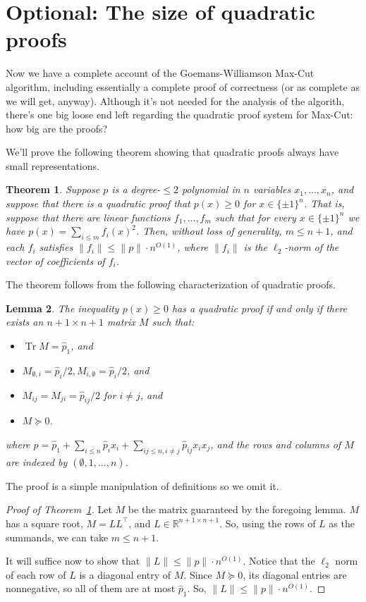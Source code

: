 \documentclass[11pt]{article}
\newtheorem{theorem}{Theorem}
\newtheorem{lemma}[theorem]{Lemma}
\newcommand{\R}{\mathbb{R}} %
\DeclareMathOperator{\Tr}{Tr} %
\begin{document}
\section{Optional: The size of quadratic proofs}
Now we have a complete account of the Goemans-Williamson Max-Cut algorithm, including essentially a complete proof of correctness (or as complete as we will get, anyway).
Although it's not needed for the analysis of the algorith, there's one big loose end left regarding the quadratic proof system for Max-Cut: how big are the proofs?

We'll prove the following theorem showing that quadratic proofs always have small representations.
\begin{theorem}
  \label{thm:proof-size}
Suppose $p$ is a degree-$\leq 2$ polynomial in $n$ variables $x_1,\ldots,x_n$, and suppose that there is a quadratic proof that $p(x) \geq 0$ for $x \in \{ \pm 1\}^n$.
That is, suppose that there are linear functions $f_1,\ldots,f_m$ such that for every $x \in \{ \pm 1 \}^n$ we have $p(x) = \sum_{i \leq m} f_i(x)^2$.
Then, without loss of generality, $m \leq n+1$, and each $f_i$ satisfies $\|f_i\| \leq \|p\| \cdot n^{O(1)}$, where $\|f_i\|$ is the $\ell_2$-norm of the vector of coefficients of $f_i$.
\end{theorem}

The theorem follows from the following characterization of quadratic proofs.

\begin{lemma}
The inequality $p(x) \geq 0$ has a quadratic proof if and only if there exists an $n+1 \times n+1$ matrix $M$ such that:
\begin{itemize}
\item $\Tr M = \hat{p}_1$, and
\item $M_{\emptyset,i} = \hat{p}_i / 2, M_{i,\emptyset} = \hat{p}_i / 2$, and 
\item $M_{ij} = M_{ji} = \hat{p}_{ij}/2$ for $i \neq j$, and
\item $M \succeq 0$.
\end{itemize}
where $p = \hat{p}_1 + \sum_{i \leq n} \hat{p}_i x_i + \sum_{ij \leq n, i \neq j} \hat{p}_{ij} x_i x_j$, and the rows and columns of $M$ are indexed by $(\emptyset,1,\ldots,n)$.
\end{lemma}
The proof is a simple manipulation of definitions so we omit it.

\begin{proof}[Proof of Theorem~\ref{thm:proof-size}]
  Let $M$ be the matrix guaranteed by the foregoing lemma.
  $M$ has a square root, $M = LL^\top$, and $L \in \R^{n+1 \times n+1}$.
  So, using the rows of $L$ as the summands, we can take $m \leq n+1$.

  It will suffice now to show that $\|L\| \leq \|p\| \cdot n^{O(1)}$.
  Notice that the $\ell_2$ norm of each row of $L$ is a diagonal entry of $M$.
  Since $M \succeq 0$, its diagonal entries are nonnegative, so all of them are at most $\hat{p}_1$.
  So, $\|L\| \leq \|p\| \cdot n^{O(1)}$.
\end{proof}
\end{document}
